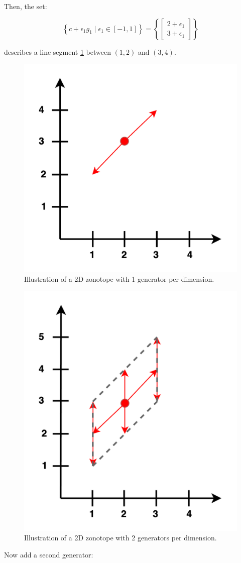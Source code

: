 \documentclass[oneside,11pt,dvipsnames]{book}
\numberwithin{equation}{section}
\theoremstyle{definition}
\theoremstyle{remark}
\begin{document}
Then, the set:

\[
\left\{c + \epsilon_1 g_1 \mid \epsilon_1 \in [-1, 1]\right\}
= \left\{
\begin{bmatrix}2 + \epsilon_1 \\ 3 + \epsilon_1\end{bmatrix}
\right\}
\]

describes a line segment \ref{fig:2d1gzonotope-example} between \((1, 2)\) and \((3, 4)\).

\begin{figure}[h]
    \centering
    \includegraphics[width=0.5\linewidth]{figure/2d-zonotope.png}
    \caption{Illustration of a 2D zonotope with 1 generator per dimension.}
    \label{fig:2d1gzonotope-example}
\end{figure}

\begin{figure}[h]
    \centering
    \includegraphics[width=0.5\linewidth]{figure/2-generator-zonotope.png}
    \caption{Illustration of a 2D zonotope with 2 generators per dimension.}
    \label{fig:2d2g-zonotope}
\end{figure}


Now add a second generator:
\end{document}
